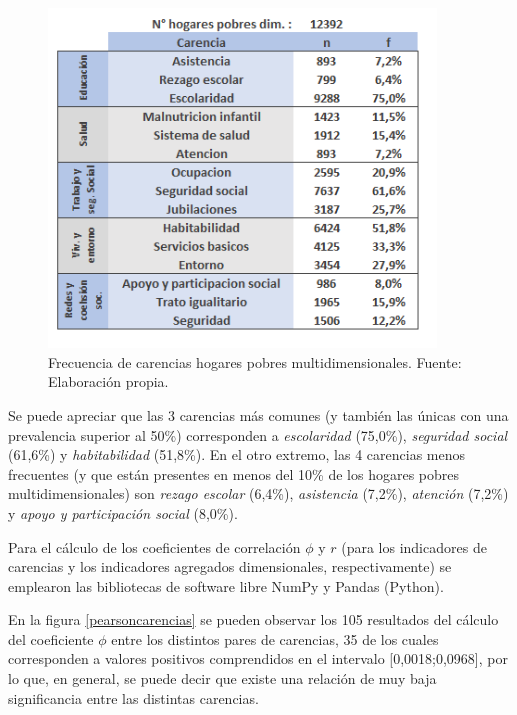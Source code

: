 \documentclass[12pt,letterpaper,spanish]{article}
\begin{document}
 \begin{figure}[H]
  \centering
    \includegraphics[height=9cm]{HOGARES/tabla_frec_general.png}
    \caption{Frecuencia de carencias hogares pobres multidimensionales. Fuente: Elaboración propia.}
    \label{frecuenciatodos}
\end{figure}
 

 
 Se puede apreciar que las 3 carencias más comunes (y también las únicas con una prevalencia superior al 50\%) corresponden a \textit{escolaridad} (75,0\%), \textit{seguridad social} (61,6\%) y \textit{habitabilidad} (51,8\%). En el otro extremo, las 4 carencias menos frecuentes (y que están presentes en menos del 10\% de los hogares pobres multidimensionales) son \textit{rezago escolar} (6,4\%), \textit{asistencia} (7,2\%), \textit{atención} (7,2\%) y \textit{apoyo y participación social} (8,0\%). 
 
 
 
 Para el cálculo de los coeficientes de correlación $\phi$ y $r$ (para los indicadores de carencias y los indicadores agregados dimensionales, respectivamente) se emplearon las bibliotecas de software libre NumPy y Pandas (Python).
 
 En la figura \ref{pearsoncarencias} se pueden observar los 105 resultados del cálculo del coeficiente $\phi$ entre los distintos pares de carencias, 35 de los cuales corresponden a valores positivos comprendidos en el intervalo [0,0018;0,0968], por lo que, en general, se puede decir que existe una relación de muy baja significancia entre las distintas carencias.
 
\end{document}
